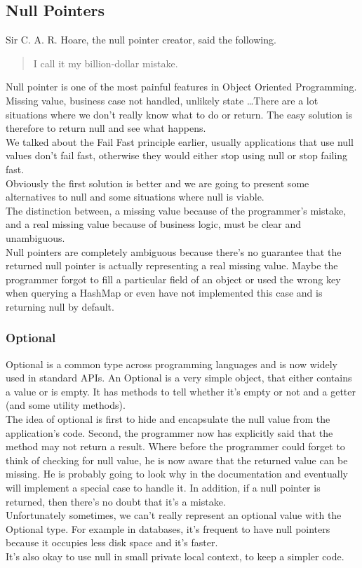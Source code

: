 \subsection{Null Pointers}\label{subsec:null-pointers}
Sir C. A. R. Hoare, the null pointer creator, said the following.
\begin{quotation}
    I call it my billion-dollar mistake.
\end{quotation}
Null pointer is one of the most painful features in Object Oriented
Programming.
Missing value, business case not handled, unlikely state \ldots There are
a lot situations where we don't really know what to do or return.
The easy solution is therefore to return null and see what happens. \\
We talked about the Fail Fast principle earlier, usually applications
that use null values don't fail fast, otherwise they would either
stop using null or stop failing fast. \\
Obviously the first solution is better and we are going to present some
alternatives to null and some situations where null is viable. \\
\newline
The distinction between, a missing value because of the
programmer's mistake, and a real missing value because of business logic,
must be clear and unambiguous. \\
Null pointers are completely ambiguous because there's no guarantee that
the returned null pointer is actually representing a real missing value.
Maybe the programmer forgot to fill a particular field of an object
or used the wrong key when querying a HashMap or even have not
implemented this case and is returning null by default.
\subsubsection{Optional}
Optional is a common type across programming languages and is now widely
used in standard APIs.
An Optional is a very simple object, that either contains a value or
is empty.
It has methods to tell whether it's empty or not and a getter (and some
utility methods). \\
The idea of optional is first to hide and encapsulate the null value
from the application's code.
Second, the programmer now has explicitly said that the method may not
return a result.
Where before the programmer could forget to think of checking for null
value, he is now aware that the returned value can be missing.
He is probably going to look why in the documentation and eventually
will implement a special case to handle it.
In addition, if a null pointer is returned, then there's no doubt that
it's a mistake. \\
Unfortunately sometimes, we can't really represent an optional value
with the Optional type.
For example in databases, it's frequent to have null pointers because
it occupies less disk space and it's faster. \\
It's also okay to use null in small private local context, to keep a
simpler code.
